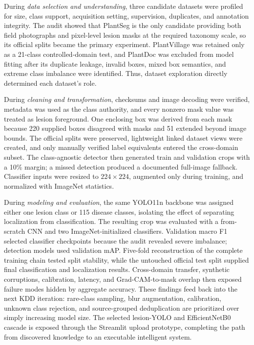 \documentclass[conference]{IEEEtran}
\begin{document}
During \emph{data selection and understanding}, three candidate datasets were profiled for size,
class support, acquisition setting, supervision, duplicates, and annotation integrity. The audit
showed that PlantSeg is the only candidate providing both field photographs and pixel-level lesion
masks at the required taxonomy scale, so its official splits became the primary experiment.
PlantVillage was retained only as a 21-class controlled-domain test, and PlantDoc was excluded from
model fitting after its duplicate leakage, invalid boxes, mixed box semantics, and extreme class
imbalance were identified. Thus, dataset exploration directly determined each dataset's role.

During \emph{cleaning and transformation}, checksums and image decoding were verified, metadata was
used as the class authority, and every nonzero mask value was treated as lesion foreground. One
enclosing box was derived from each mask because 220 supplied boxes disagreed with masks and 51
extended beyond image bounds. The official splits were preserved, lightweight linked dataset views
were created, and only manually verified label equivalents entered the cross-domain subset. The
class-agnostic detector then generated train and validation crops with a 10\% margin; a missed
detection produced a documented full-image fallback. Classifier inputs were resized to
$224\times224$, augmented only during training, and normalized with ImageNet statistics.

During \emph{modeling and evaluation}, the same YOLO11n backbone was assigned either one lesion
class or 115 disease classes, isolating the effect of separating localization from classification.
The resulting crop was evaluated with a from-scratch CNN and two ImageNet-initialized classifiers.
Validation macro F1 selected classifier checkpoints because the audit revealed severe imbalance;
detection models used validation mAP. Five-fold reconstruction of the complete training chain
tested split stability, while the untouched official test split supplied final classification and
localization results. Cross-domain transfer, synthetic corruptions, calibration, latency, and
Grad-CAM-to-mask overlap then exposed failure modes hidden by aggregate accuracy. These findings
feed back into the next KDD iteration: rare-class sampling, blur augmentation, calibration, unknown
class rejection, and source-grouped deduplication are prioritized over simply increasing model
size. The selected lesion-YOLO and EfficientNetB0 cascade is exposed through the Streamlit upload
prototype, completing the path from discovered knowledge to an executable intelligent system.
\end{document}
